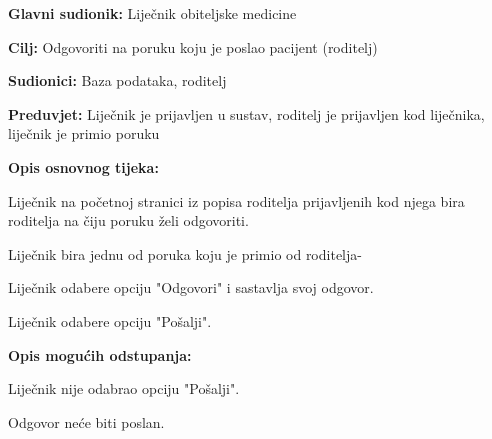 					\noindent {}
					\begin{packed_item}
						
						\item \textbf{Glavni sudionik: }Liječnik obiteljske medicine
						\item  \textbf{Cilj:} Odgovoriti na poruku koju je poslao pacijent (roditelj)
						\item  \textbf{Sudionici:} Baza podataka, roditelj
						\item  \textbf{Preduvjet:} Liječnik je prijavljen u sustav, roditelj je prijavljen kod liječnika, liječnik je primio poruku
						\item  \textbf{Opis osnovnog tijeka:}
						
						\item[] \begin{packed_enum}
							
							\item Liječnik na početnoj stranici iz popisa roditelja prijavljenih kod njega bira roditelja na čiju poruku želi odgovoriti.
							\item Liječnik bira jednu od poruka koju je primio od roditelja-
							\item Liječnik odabere opciju "Odgovori" i sastavlja svoj odgovor.
							\item Liječnik odabere opciju "Pošalji".
						\end{packed_enum}
						
						\item  \textbf{Opis mogućih odstupanja:}
						
						\item[] \begin{packed_item}
							
							\item[3.a] Liječnik nije odabrao opciju "Pošalji".
							\item[] \begin{packed_enum}
								
								\item Odgovor neće biti poslan.
							\end{packed_enum}
							
							
						\end{packed_item}
						
						
					\end{packed_item}
					
